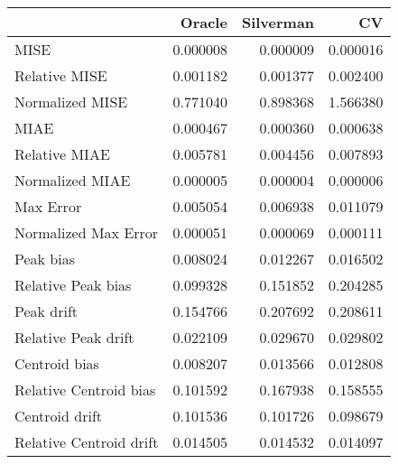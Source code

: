 \begin{tabular}{lrrr}
  \hline
 & Oracle & Silverman & CV \\ 
  \hline
MISE & 0.000008 & 0.000009 & 0.000016 \\ 
  Relative MISE & 0.001182 & 0.001377 & 0.002400 \\ 
  Normalized MISE & 0.771040 & 0.898368 & 1.566380 \\ 
  MIAE & 0.000467 & 0.000360 & 0.000638 \\ 
  Relative MIAE & 0.005781 & 0.004456 & 0.007893 \\ 
  Normalized MIAE & 0.000005 & 0.000004 & 0.000006 \\ 
  Max Error & 0.005054 & 0.006938 & 0.011079 \\ 
  Normalized Max Error & 0.000051 & 0.000069 & 0.000111 \\ 
  Peak bias & 0.008024 & 0.012267 & 0.016502 \\ 
  Relative Peak bias & 0.099328 & 0.151852 & 0.204285 \\ 
  Peak drift & 0.154766 & 0.207692 & 0.208611 \\ 
  Relative Peak drift & 0.022109 & 0.029670 & 0.029802 \\ 
  Centroid bias & 0.008207 & 0.013566 & 0.012808 \\ 
  Relative Centroid bias & 0.101592 & 0.167938 & 0.158555 \\ 
  Centroid drift & 0.101536 & 0.101726 & 0.098679 \\ 
  Relative Centroid drift & 0.014505 & 0.014532 & 0.014097 \\ 
   \hline
\end{tabular}
